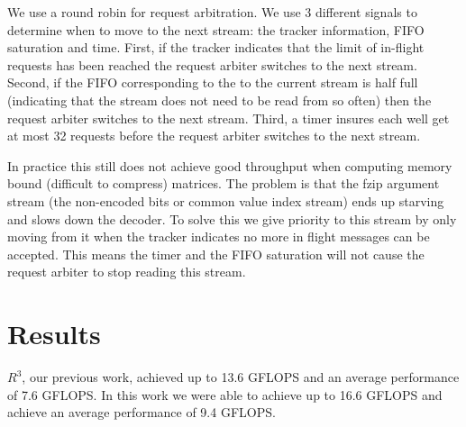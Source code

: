We use a round robin for request arbitration. We use 3 different signals to determine when to move to the next stream: the tracker information, FIFO saturation and time. First, if the tracker indicates that the limit of in-flight requests has been reached the request arbiter switches to the next stream. Second, if the FIFO corresponding to the to the current stream is half full (indicating that the stream does not need to be read from so often) then the request arbiter switches to the next stream. Third, a timer insures each well get at most 32 requests before the request arbiter switches to the next stream.

\par In practice this still does not achieve good throughput when computing memory bound (difficult to compress) matrices. The problem is that the fzip argument stream (the non-encoded bits or common value index stream) ends up starving and slows down the decoder. To solve this we give priority to this stream by only moving from it when the tracker indicates no more in flight messages can be accepted. This means the timer and the FIFO saturation will not cause the request arbiter to stop reading this stream.
\section{Results}
\label{sec:results}
$R^3$, our previous work, achieved up to 13.6 GFLOPS and an average performance of 7.6 GFLOPS. In this work we were able to achieve up to 16.6 GFLOPS and achieve an average performance of 9.4 GFLOPS.

